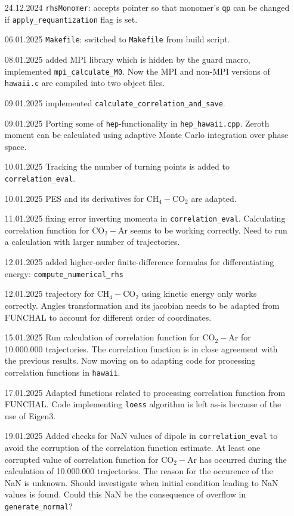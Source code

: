 \documentclass{article}
\begin{document}
\begin{enumerate}
    \item [24.12.2024] \texttt{rhsMonomer}: accepts pointer so that monomer's \texttt{qp} can be changed if \texttt{apply\_requantization} flag is set.
    \item [06.01.2025] \texttt{Makefile}: switched to \texttt{Makefile} from build script.
    \item [08.01.2025] added MPI library which is hidden by the guard macro, implemented \texttt{mpi\_calculate\_M0}. Now the MPI and non-MPI versions of \texttt{hawaii.c} are compiled into two object files.  
    \item [09.01.2025] implemented \texttt{calculate\_correlation\_and\_save}. 
    \item [09.01.2025] Porting some of \texttt{hep}-functionality in \texttt{hep\_hawaii.cpp}. Zeroth moment can be calculated using adaptive Monte Carlo integration over phase space.
    \item [10.01.2025] Tracking the number of turning points is added to \texttt{correlation\_eval}.
    \item [10.01.2025] PES and its derivatives for CH$_4-$CO$_2$ are adapted.
    \item [11.01.2025] fixing error inverting momenta in \texttt{correlation\_eval}. Calculating correlation function for CO$_2-$Ar seems to be working correctly. Need to run a calculation with larger number of trajectories.
    \item [12.01.2025] added higher-order finite-difference formulas for differentiating energy: \texttt{compute\_numerical\_rhs} 
    \item [12.01.2025] trajectory for CH$_4-$CO$_2$ using kinetic energy only works correctly. Angles transformation and its jacobian needs to be adapted from FUNCHAL to account for different order of coordinates.
    \item [15.01.2025] Run calculation of correlation function for CO$_2-$Ar for 10.000.000 trajectories. The correlation function is in close agreement with the previous results. Now moving on to adapting code for processing correlation functions in \texttt{hawaii}.
    \item [17.01.2025] Adapted functions related to processing correlation function from FUNCHAL. Code implementing \texttt{loess} algorithm is left as-is because of the use of Eigen3.
    \item [19.01.2025] Added checks for NaN values of dipole in \texttt{correlation\_eval} to avoid the corruption of the correlation function estimate. At least one corrupted value of correlation function for CO$_2-$Ar  has occurred during the calculation of 10.000.000 trajectories. {\color{red} The reason for the occurence of the NaN is unknown. Should investigate when initial condition leading to NaN values is found.} Could this NaN be the consequence of overflow in \texttt{generate\_normal}?

\end{enumerate}
\end{document}
